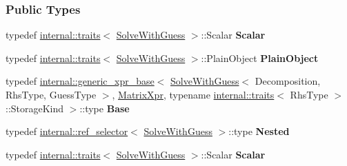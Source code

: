 \subsubsection*{Public Types}
\begin{DoxyCompactItemize}
\item 
\mbox{\label{group___iterative_linear_solvers___module_aa16d60b352ae942494ea37b974ac7b43}} 
typedef \hyperlink{struct_eigen_1_1internal_1_1traits}{internal\+::traits}$<$ \hyperlink{group___iterative_linear_solvers___module_class_eigen_1_1_solve_with_guess}{Solve\+With\+Guess} $>$\+::Scalar {\bfseries Scalar}
\item 
\mbox{\label{group___iterative_linear_solvers___module_a028591bc4ab3fd37657a4a4e88833e3a}} 
typedef \hyperlink{struct_eigen_1_1internal_1_1traits}{internal\+::traits}$<$ \hyperlink{group___iterative_linear_solvers___module_class_eigen_1_1_solve_with_guess}{Solve\+With\+Guess} $>$\+::Plain\+Object {\bfseries Plain\+Object}
\item 
\mbox{\label{group___iterative_linear_solvers___module_a9d850be775ecb321b2b7a711fdca8e75}} 
typedef \hyperlink{struct_eigen_1_1internal_1_1generic__xpr__base}{internal\+::generic\+\_\+xpr\+\_\+base}$<$ \hyperlink{group___iterative_linear_solvers___module_class_eigen_1_1_solve_with_guess}{Solve\+With\+Guess}$<$ Decomposition, Rhs\+Type, Guess\+Type $>$, \hyperlink{struct_eigen_1_1_matrix_xpr}{Matrix\+Xpr}, typename \hyperlink{struct_eigen_1_1internal_1_1traits}{internal\+::traits}$<$ Rhs\+Type $>$\+::Storage\+Kind $>$\+::type {\bfseries Base}
\item 
\mbox{\label{group___iterative_linear_solvers___module_adea6251ef44d86ce8b8168d031362b76}} 
typedef \hyperlink{struct_eigen_1_1internal_1_1ref__selector}{internal\+::ref\+\_\+selector}$<$ \hyperlink{group___iterative_linear_solvers___module_class_eigen_1_1_solve_with_guess}{Solve\+With\+Guess} $>$\+::type {\bfseries Nested}
\item 
\mbox{\label{group___iterative_linear_solvers___module_aa16d60b352ae942494ea37b974ac7b43}} 
typedef \hyperlink{struct_eigen_1_1internal_1_1traits}{internal\+::traits}$<$ \hyperlink{group___iterative_linear_solvers___module_class_eigen_1_1_solve_with_guess}{Solve\+With\+Guess} $>$\+::Scalar {\bfseries Scalar}

\end{DoxyCompactItemize}
